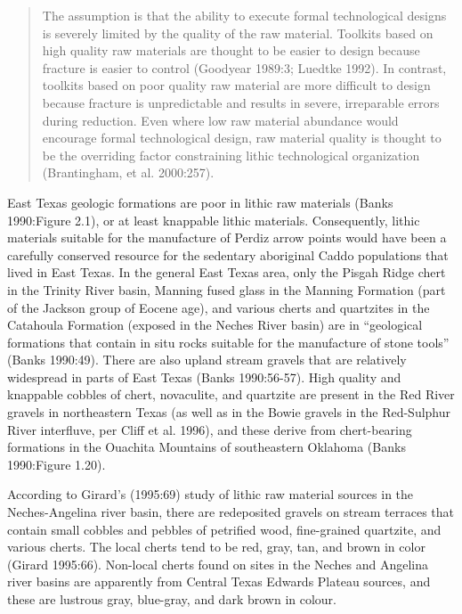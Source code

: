 \documentclass[review]{elsarticle}
\begin{document}
\begin{quote}
The assumption is that the ability to execute formal technological designs is severely limited by the quality of the raw material. Toolkits based on high quality raw materials are thought to be easier to design because fracture is easier to control (Goodyear 1989:3; Luedtke 1992). In contrast, toolkits based on poor quality raw material are more difficult to design because fracture is unpredictable and results in severe, irreparable errors during reduction. Even where low raw material abundance would encourage formal technological design, raw material quality is thought to be the overriding factor constraining lithic technological organization (Brantingham, et al. 2000:257).
\end{quote}

East Texas geologic formations are poor in lithic raw materials (Banks 1990:Figure 2.1), or at least knappable lithic materials. Consequently, lithic materials suitable for the manufacture of Perdiz arrow points would have been a carefully conserved resource for the sedentary aboriginal Caddo populations that lived in East Texas. In the general East Texas area, only the Pisgah Ridge chert in the Trinity River basin, Manning fused glass in the Manning Formation (part of the Jackson group of Eocene age), and various cherts and quartzites in the Catahoula Formation (exposed in the Neches River basin) are in “geological formations that contain in situ rocks suitable for the manufacture of stone tools” (Banks 1990:49). There are also upland stream gravels that are relatively widespread in parts of East Texas (Banks 1990:56-57). High quality and knappable cobbles of chert, novaculite, and quartzite are present in the Red River gravels in northeastern Texas (as well as in the Bowie gravels in the Red-Sulphur River interfluve, per Cliff et al. 1996), and these derive from chert-bearing formations in the Ouachita Mountains of southeastern Oklahoma (Banks 1990:Figure 1.20).

According to Girard’s (1995:69) study of lithic raw material sources in the Neches-Angelina river basin, there are redeposited gravels on stream terraces that contain small cobbles and pebbles of petrified wood, fine-grained quartzite, and various cherts. The local cherts tend to be red, gray, tan, and brown in color (Girard 1995:66). Non-local cherts found on sites in the Neches and Angelina river basins are apparently from Central Texas Edwards Plateau sources, and these are lustrous gray, blue-gray, and dark brown in colour.
\end{document}
